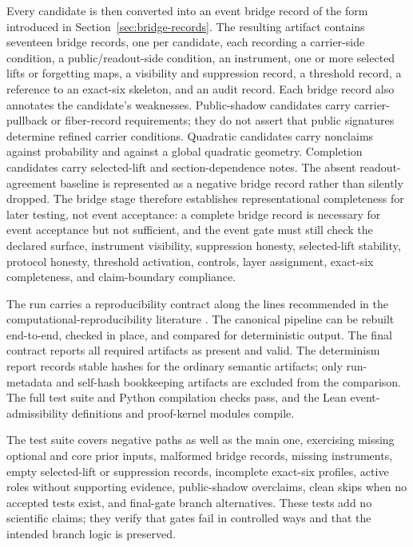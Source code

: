 \documentclass[11pt]{article}
\theoremstyle{definition}
\begin{document}
Every candidate is then converted into an event bridge record of the form introduced in Section~\ref{sec:bridge-records}. The resulting artifact contains seventeen bridge records, one per candidate, each recording a carrier-side condition, a public/readout-side condition, an instrument, one or more selected lifts or forgetting maps, a visibility and suppression record, a threshold record, a reference to an exact-six skeleton, and an audit record. Each bridge record also annotates the candidate's weaknesses. Public-shadow candidates carry carrier-pullback or fiber-record requirements; they do not assert that public signatures determine refined carrier conditions. Quadratic candidates carry nonclaims against probability and against a global quadratic geometry. Completion candidates carry selected-lift and section-dependence notes. The absent readout-agreement baseline is represented as a negative bridge record rather than silently dropped. The bridge stage therefore establishes representational completeness for later testing, not event acceptance: a complete bridge record is necessary for event acceptance but not sufficient, and the event gate must still check the declared surface, instrument visibility, suppression honesty, selected-lift stability, protocol honesty, threshold activation, controls, layer assignment, exact-six completeness, and claim-boundary compliance.

The run carries a reproducibility contract along the lines recommended in the computational-reproducibility literature \citep{Sandve2013}. The canonical pipeline can be rebuilt end-to-end, checked in place, and compared for deterministic output. The final contract reports all required artifacts as present and valid. The determinism report records stable hashes for the ordinary semantic artifacts; only run-metadata and self-hash bookkeeping artifacts are excluded from the comparison. The full test suite and Python compilation checks pass, and the Lean event-admissibility definitions and proof-kernel modules compile.

The test suite covers negative paths as well as the main one, exercising missing optional and core prior inputs, malformed bridge records, missing instruments, empty selected-lift or suppression records, incomplete exact-six profiles, active roles without supporting evidence, public-shadow overclaims, clean skips when no accepted tests exist, and final-gate branch alternatives. These tests add no scientific claims; they verify that gates fail in controlled ways and that the intended branch logic is preserved.
\end{document}
